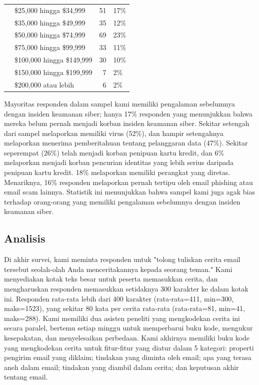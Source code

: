 \documentclass[lettersize,journal]{IEEEtran}
\begin{document}
\begin{table}[h!]
\begin{tabular}{@{}llrl@{}}
                                                   & \$25,000 hingga \$34,999                 & 51         & 17\%        \\
                                                   & \$35,000 hingga \$49,999                 & 35         & 12\%        \\
                                                   & \$50,000 hingga \$74,999                 & 69         & 23\%        \\
                                                   & \$75,000 hingga \$99,999                 & 33         & 11\%        \\
                                                   & \$100,000 hingga \$149,999               & 30         & 10\%        \\
                                                   & \$150,000 hingga \$199,999               & 7          & 2\%         \\
                                                   & \$200,000 atau lebih                     & 6          & 2\%         \\ \bottomrule
  \end{tabular}
\end{table}

Mayoritas responden dalam sampel kami memiliki pengalaman sebelumnya dengan
insiden keamanan siber; hanya 17\% responden yang menunjukkan bahwa mereka
belum pernah menjadi korban insiden keamanan siber. Sekitar setengah dari
sampel melaporkan memiliki virus (52\%), dan hampir setengahnya melaporkan
menerima pemberitahuan tentang pelanggaran data (47\%). Sekitar seperempat
(26\%) telah menjadi korban penipuan kartu kredit, dan 6\% melaporkan menjadi
korban pencurian identitas yang lebih serius daripada penipuan kartu kredit.
18\% melaporkan memiliki perangkat yang diretas. Menariknya, 16\% responden
melaporkan pernah tertipu oleh email phishing atau email scam lainnya.
Statistik ini menunjukkan bahwa sampel kami juga agak bias terhadap orang-orang
yang memiliki pengalaman sebelumnya dengan insiden keamanan siber.

\subsection{Analisis}

Di akhir survei, kami meminta responden untuk "tolong tuliskan cerita email
tersebut seolah-olah Anda menceritakannya kepada seorang teman." Kami
menyediakan kotak teks besar untuk peserta memasukkan cerita, dan mengharuskan
responden memasukkan setidaknya 300 karakter ke dalam kotak ini. Responden
rata-rata lebih dari 400 karakter (rata-rata=411, min=300, maks=1523), yang
sekitar 80 kata per cerita rata-rata (rata-rata=81, min=41, maks=288). Kami
memiliki dua asisten peneliti yang mengkodekan cerita ini secara paralel,
bertemu setiap minggu untuk memperbarui buku kode, mengukur kesepakatan, dan
menyelesaikan perbedaan. Kami akhirnya memiliki buku kode yang mengkodekan
cerita untuk fitur-fitur yang diatur dalam 5 kategori: properti pengirim email
yang diklaim; tindakan yang diminta oleh email; apa yang terasa aneh dalam
email; tindakan yang diambil dalam cerita; dan keputusan akhir tentang email.
\end{document}
